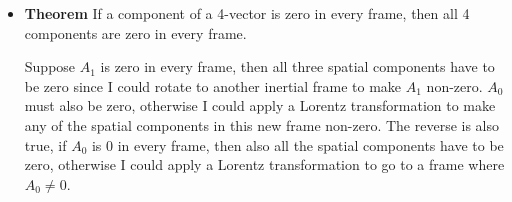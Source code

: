 \documentclass[12pt]{article}
\newif\ifshowboardanswers
\newif\ifshowboardquestion
\newcommand{\boardanswer}[1]{\ifshowboardanswers\\[0.35em]\textcolor{blue}{\textbf{Answer.} #1}\fi}
\begin{document}
\begin{itemize}
\item {\bf Theorem} If a component of a 4-vector is zero in every frame, then all 4 components are zero in every frame.  

Suppose $A_1$ is zero in every frame, then all three spatial components have to be zero since I could rotate to another inertial frame to make $A_1$ non-zero. $A_0$ must also be zero, otherwise I could apply a Lorentz transformation to make any of the spatial components in this new frame non-zero. The reverse is also true, if $A_0$ is 0 in every frame, then also all the spatial components have to be zero, otherwise I could apply a Lorentz transformation to go to a frame where $A_0\neq 0$. 
\end{itemize}


   
\ifshowboardquestion
\section*{Board Question}
\begin{tcolorbox}[colback=blue!5!white]
Two particles have four-velocities $U_1^\mu$ and $U_2^\mu$. In the rest frame of particle 1, particle 2 moves with speed $v_{\rm rel}$.
\begin{enumerate}
    \item Write $U_1^\mu$ and $U_2^\mu$ in the rest frame of particle 1.
    \boardanswer{Using $c=1$, $U_1=(1,0,0,0)$ and $U_2=(\gamma_{\rm rel},\gamma_{\rm rel}v_{\rm rel},0,0)$ after aligning the $x$ axis with particle 2.}
    \item Compute the Minkowski inner product $U_1\cdot U_2$.
    \boardanswer{With the $(+---)$ convention, $U_1\cdot U_2=\gamma_{\rm rel}$.}
    \item Show how this invariant determines $\gamma_{\rm rel}$.
    \boardanswer{Because the inner product is invariant, $\gamma_{\rm rel}=U_1\cdot U_2$ can be computed in any frame.}
    \item Explain why this is a frame-independent way to define relative speed.
    \boardanswer{Once $\gamma_{\rm rel}$ is known, $v_{\rm rel}=\sqrt{1-1/\gamma_{\rm rel}^2}$. Since $\gamma_{\rm rel}$ came from an invariant, so does the relative speed.}
\end{enumerate}
\end{tcolorbox}
\fi
\end{document}
